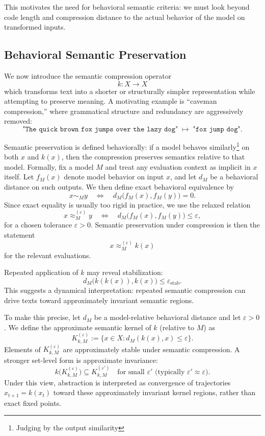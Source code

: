 This motivates the need for behavioral semantic criteria: we must look beyond code length and compression distance to the actual behavior of the model on transformed inputs.

\subsection{Behavioral Semantic Preservation}
We now introduce the semantic compression operator
\[
k : X \to X
\]
which transforms text into a shorter or structurally simpler representation while attempting to preserve meaning. A motivating example is ``caveman compression,'' where grammatical structure and redundancy are aggressively removed:
\[
\texttt{"The quick brown fox jumps over the lazy dog"}
\;\mapsto\;
\texttt{"fox jump dog"}.
\]

Semantic preservation is defined behaviorally: if a model behaves similarly\footnote{Judging by the output similarity} on both $x$ and $k(x)$, then the compression preserves semantics relative to that model. Formally, fix a model $M$ and treat any evaluation context as implicit in $x$ itself. Let $f_M(x)$ denote model behavior on input $x$, and let $d_M$ be a behavioral distance on such outputs. We then define exact behavioral equivalence by
\[
x \sim_M y
\quad \Longleftrightarrow \quad
d_M\big(f_M(x), f_M(y)\big) = 0.
\]
Since exact equality is usually too rigid in practice, we use the relaxed relation
\[
x \approx_M^{(\varepsilon)} y
\quad \Longleftrightarrow \quad
d_M\big(f_M(x), f_M(y)\big) \le \varepsilon,
\]
for a chosen tolerance $\varepsilon > 0$. Semantic preservation under compression is then the statement
\[
x \approx_M^{(\varepsilon)} k(x)
\]
for the relevant evaluations.

Repeated application of $k$ may reveal stabilization:
\[
d_M\big(k(k(x)), k(x)\big) \le \varepsilon_{\mathrm{stab}}.
\]
This suggests a dynamical interpretation: repeated semantic compression can drive texts toward approximately invariant semantic regions.

To make this precise, let $d_M$ be a model-relative behavioral distance and let $\varepsilon > 0$. We define the approximate semantic kernel of $k$ (relative to $M$) as
\[
K_{k,M}^{(\varepsilon)} := \{x \in X : d_M(k(x),x) \le \varepsilon\}.
\]
Elements of $K_{k,M}^{(\varepsilon)}$ are approximately stable under semantic compression. A stronger set-level form is approximate invariance:
\[
k\big(K_{k,M}^{(\varepsilon)}\big) \subseteq K_{k,M}^{(\varepsilon')} 
\quad \text{for small } \varepsilon' \text{ (typically } \varepsilon' \approx \varepsilon\text{)}.
\]
Under this view, abstraction is interpreted as convergence of trajectories $x_{t+1}=k(x_t)$ toward these approximately invariant kernel regions, rather than exact fixed points.


